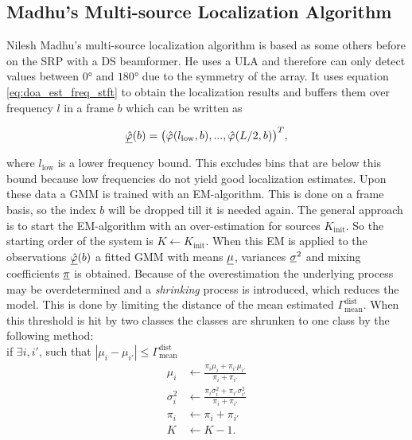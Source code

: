 



\subsection{Madhu's Multi-source Localization Algorithm}
\label{subsec:madhu_alg}

Nilesh Madhu's multi-source localization algorithm is based as some others before on the \ac{SRP} with a \ac{DS} beamformer. He uses a \ac{ULA} and therefore can only detect values between $\ang{0}$ and $\ang{180}$ due to the symmetry of the array. It uses equation \ref{eq:doa_est_freq_stft} to obtain the localization results and buffers them over frequency $l$ in a frame $b$ which can be written as

\begin{equation}
\underline{\hat{\varphi}}(b) = \big(\hat{\varphi}(l_\text{low},b),...,\hat{\varphi}(L/2,b) \big)^T,
\end{equation}

where $l_\text{low}$ is a lower frequency bound. This excludes bins that are below this bound because low frequencies do not yield good localization estimates. Upon these data a \ac{GMM} is trained with an \ac{EM}-algorithm. This is done on a frame basis, so the index $b$ will be dropped till it is needed again. The general approach is to start the \ac{EM}-algorithm with an over-estimation for sources $K_\text{init}$. So the starting order of the system is $K\leftarrow K_\text{init}$. When this \ac{EM} is applied to the observations $\underline{\hat{\varphi}}(b)$ a fitted \ac{GMM} with means $\underline{\mu}$, variances $\underline{\sigma}^2$ and mixing coefficients $\underline{\pi}$ is obtained. Because of the overestimation the underlying process may be overdetermined and a \emph{shrinking} process is introduced, which reduces the model. This is done by limiting the distance of the mean estimated $\Gamma_\text{mean}^\text{dist}$. When this threshold is hit by two classes the classes are shrunken to one class by the following method:\\
if $\exists i,i'$, such that $|\mu_i-\mu_{i'}|\leq\Gamma_\text{mean}^\text{dist}$
\begin{equation}
\begin{split}
\mu_i &\leftarrow \frac{\pi_i\mu_i+\pi_{i'}\mu_{i'}}{\pi_i+\pi_{i'}}\\
\sigma^2_i &\leftarrow \frac{\pi_i\sigma^2_i+\pi_{i'}\sigma^2_{i'}}{\pi_i+\pi_{i'}}\\
\pi_i &\leftarrow \pi_i+\pi_{i'}\\
K &\leftarrow K-1.
\end{split}
\end{equation}

